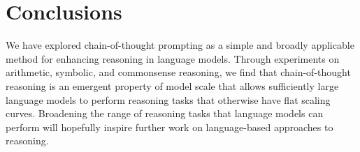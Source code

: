 \section{Conclusions}
We have explored chain-of-thought prompting as a simple and broadly applicable method for enhancing reasoning in language models. Through experiments on arithmetic, symbolic, and commonsense reasoning, we find that chain-of-thought reasoning is an emergent property of model scale that allows sufficiently large language models to perform reasoning tasks that otherwise have flat scaling curves. Broadening the range of reasoning tasks that language models can perform will hopefully inspire further work on language-based approaches to reasoning. 


